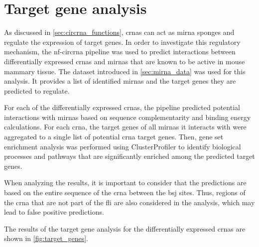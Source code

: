 \section{Target gene analysis}

As discussed in \cref{sec:circrna_functions}, \glspl{crna} can act as
\gls{mirna} sponges and regulate the expression of target genes.
In order to investigate this regulatory mechanism, the \gls{nf-circrna}
pipeline was used to predict interactions between differentially expressed
\glspl{crna} and \glspl{mirna} that are known to be active in mouse mammary
tissue.
The dataset introduced in \cref{sec:mirna_data} was used for this analysis.
It provides a list of identified \glspl{mirna} and the target genes they are
predicted to regulate.

For each of the differentially expressed \glspl{crna}, the pipeline predicted
potential interactions with \glspl{mirna} based on sequence complementarity and
binding energy calculations.
For each \gls{crna}, the target genes of all \glspl{mirna} it interacts with
were aggregated to a single list of potential \gls{crna} target genes.
Then, gene set enrichment analysis was performed using ClusterProfiler to
identify biological processes and pathways that are significantly enriched
among the predicted target genes.

When analyzing the results, it is important to consider that the predictions
are based on the entire sequence of the \gls{crna} between the \gls{bsj} sites.
Thus, regions of the \gls{crna} that are not part of the \gls{fli} are also
considered in the analysis, which may lead to false positive predictions.

The results of the target gene analysis for the differentially expressed
\glspl{crna} are shown in \cref{fig:target_genes}.

